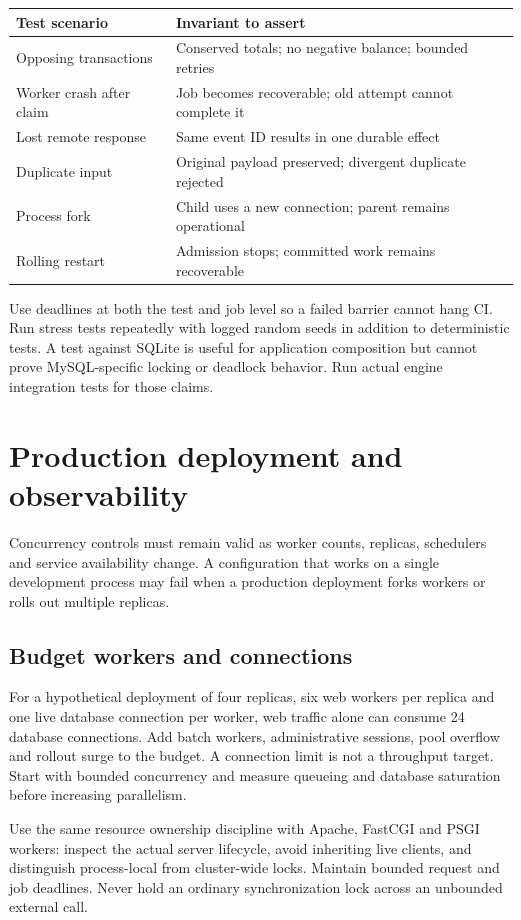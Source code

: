 \begin{longtable}{L{.31\linewidth}L{.61\linewidth}}
\toprule Test scenario & Invariant to assert \\ \midrule\endhead
Opposing transactions & Conserved totals; no negative balance; bounded retries \\
Worker crash after claim & Job becomes recoverable; old attempt cannot complete it \\
Lost remote response & Same event ID results in one durable effect \\
Duplicate input & Original payload preserved; divergent duplicate rejected \\
Process fork & Child uses a new connection; parent remains operational \\
Rolling restart & Admission stops; committed work remains recoverable \\
\bottomrule
\end{longtable}
Use deadlines at both the test and job level so a failed barrier cannot
hang CI. Run stress tests repeatedly with logged random seeds in addition
to deterministic tests. A test against SQLite is useful for application
composition but cannot prove MySQL-specific locking or deadlock behavior.
Run actual engine integration tests for those claims.

\chapter{Production deployment and observability}
\label{ch:enterprise-operations}
Concurrency controls must remain valid as worker counts, replicas,
schedulers and service availability change. A configuration that works on
a single development process may fail when a production deployment forks
workers or rolls out multiple replicas.

\section{Budget workers and connections}
For a hypothetical deployment of four replicas, six web workers per
replica and one live database connection per worker, web traffic alone can
consume 24 database connections. Add batch workers, administrative sessions,
pool overflow and rollout surge to the budget. A connection limit is not
a throughput target. Start with bounded concurrency and measure queueing
and database saturation before increasing parallelism.

Use the same resource ownership discipline with Apache, FastCGI and PSGI
workers: inspect the actual server lifecycle, avoid inheriting live clients,
and distinguish process-local from cluster-wide locks. Maintain bounded
request and job deadlines. Never hold an ordinary synchronization lock
across an unbounded external call.

